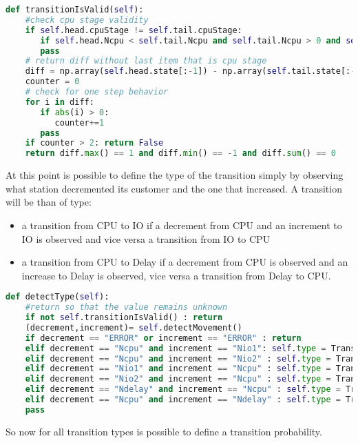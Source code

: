 \documentclass[12pt,a4paper]{article}
\begin{document}
\begin{lstlisting}[language=python,breaklines]
    def transitionIsValid(self):
    #check cpu stage validity
    if self.head.cpuStage != self.tail.cpuStage:
       if self.head.Ncpu < self.tail.Ncpu and self.tail.Ncpu > 0 and self.head.Ncpu > 0: return False
       pass
    # return diff without last item that is cpu stage
    diff = np.array(self.head.state[:-1]) - np.array(self.tail.state[:-1])
    counter = 0
    # check for one step behavior
    for i in diff:
       if abs(i) > 0:
          counter+=1
       pass
    if counter > 2: return False
    return diff.max() == 1 and diff.min() == -1 and diff.sum() == 0 
\end{lstlisting}

At this point is possible to define the type of the transition simply by observing what station decremented its customer and the one that increased. A transition will be than of type: 

\begin{itemize}
    \item a transition from CPU to IO if a decrement from CPU and an increment to IO is observed and vice versa a transition from IO to CPU 
    \item a transition from CPU to Delay if a decrement from CPU is observed and an increase to Delay is observed, vice versa a transition from Delay to CPU.
\end{itemize}

\begin{lstlisting}[language=python]
    def detectType(self):
    #return so that the value remains unknown
    if not self.transitionIsValid() : return
    (decrement,increment)= self.detectMovement()
    if decrement == "ERROR" or increment == "ERROR" : return 
    elif decrement == "Ncpu" and increment == "Nio1": self.type = Transition.TransitionType.CPU_TO_IO1
    elif decrement == "Ncpu" and increment == "Nio2" : self.type = Transition.TransitionType.CPU_TO_IO2
    elif decrement == "Nio1" and increment == "Ncpu" : self.type = Transition.TransitionType.IO1_TO_CPU
    elif decrement == "Nio2" and increment == "Ncpu" : self.type = Transition.TransitionType.IO2_TO_CPU
    elif decrement == "Ndelay" and increment == "Ncpu" : self.type = Transition.TransitionType.DELAY_TO_CPU
    elif decrement == "Ncpu" and increment == "Ndelay" : self.type = Transition.TransitionType.CPU_TO_DELAY
    pass
\end{lstlisting}

So now for all transition types is possible to define a transition probability. \pagebreak
\end{document}
